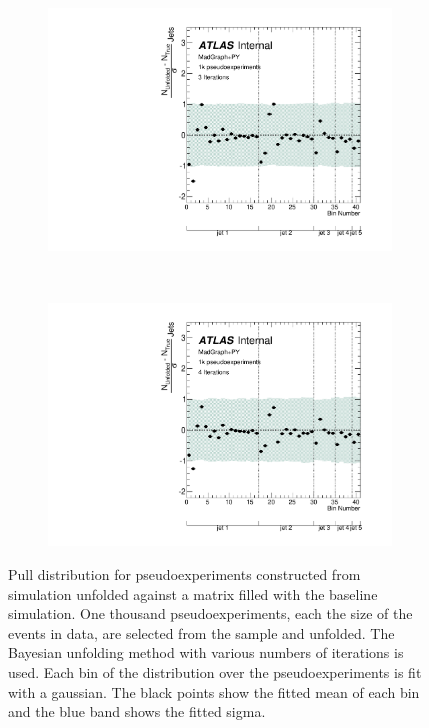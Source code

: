 \begin{figure}
\begin{subfigure}[]{0.5\textwidth}
\includegraphics[width=\textwidth]{fig/Stress/110872atlfast/Pull3Iterations.pdf}
\end{subfigure}
~
\begin{subfigure}[]{0.5\textwidth}
\includegraphics[width=\textwidth]{fig/Stress/110872atlfast/Pull4Iterations.pdf}
\end{subfigure}
\caption{Pull distribution for pseudoexperiments constructed from \peight~ simulation unfolded against a matrix filled with the baseline simulation. One thousand pseudoexperiments, each the size of the events in data, are selected from the sample and unfolded. The Bayesian unfolding method with various numbers of iterations is used. Each bin of the distribution over the pseudoexperiments is fit with a gaussian. The black points show the fitted mean of each bin and the blue band shows the fitted sigma.}
\label{fig:p8pull}
\end{figure}
